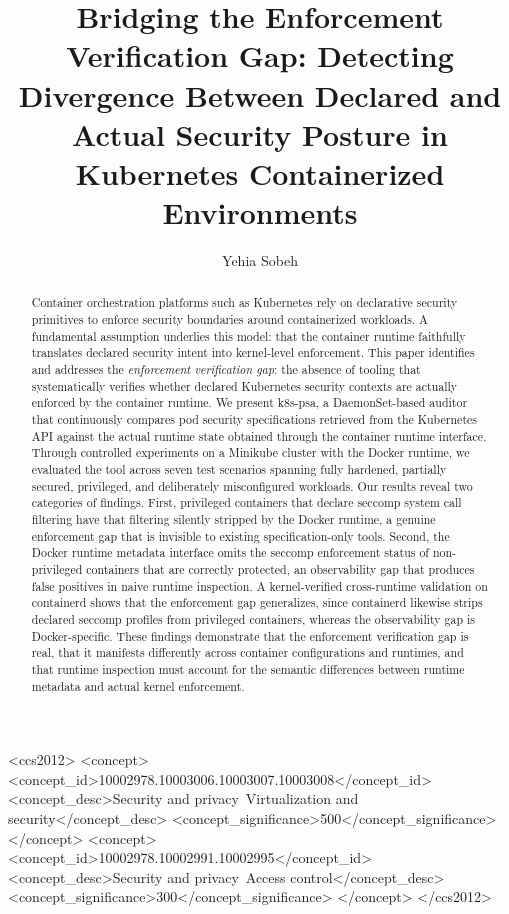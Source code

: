 \documentclass[sigconf]{acmart}
\begin{document}
\title{Bridging the Enforcement Verification Gap: Detecting Divergence Between Declared and Actual Security Posture in Kubernetes Containerized Environments}

\author{Yehia Sobeh}

\begin{abstract}
Container orchestration platforms such as Kubernetes rely on declarative security primitives to enforce security boundaries around containerized workloads. A fundamental assumption underlies this model: that the container runtime faithfully translates declared security intent into kernel-level enforcement. This paper identifies and addresses the \emph{enforcement verification gap}: the absence of tooling that systematically verifies whether declared Kubernetes security contexts are actually enforced by the container runtime. We present k8s-psa, a DaemonSet-based auditor that continuously compares pod security specifications retrieved from the Kubernetes API against the actual runtime state obtained through the container runtime interface. Through controlled experiments on a Minikube cluster with the Docker runtime, we evaluated the tool across seven test scenarios spanning fully hardened, partially secured, privileged, and deliberately misconfigured workloads. Our results reveal two categories of findings. First, privileged containers that declare seccomp system call filtering have that filtering silently stripped by the Docker runtime, a genuine enforcement gap that is invisible to existing specification-only tools. Second, the Docker runtime metadata interface omits the seccomp enforcement status of non-privileged containers that are correctly protected, an observability gap that produces false positives in naive runtime inspection. A kernel-verified cross-runtime validation on containerd shows that the enforcement gap generalizes, since containerd likewise strips declared seccomp profiles from privileged containers, whereas the observability gap is Docker-specific. These findings demonstrate that the enforcement verification gap is real, that it manifests differently across container configurations and runtimes, and that runtime inspection must account for the semantic differences between runtime metadata and actual kernel enforcement.
\end{abstract}

\begin{CCSXML}
<ccs2012>
 <concept>
  <concept_id>10002978.10003006.10003007.10003008</concept_id>
  <concept_desc>Security and privacy~Virtualization and security</concept_desc>
  <concept_significance>500</concept_significance>
 </concept>
 <concept>
  <concept_id>10002978.10002991.10002995</concept_id>
  <concept_desc>Security and privacy~Access control</concept_desc>
  <concept_significance>300</concept_significance>
 </concept>
</ccs2012>
\end{CCSXML}
\end{document}
